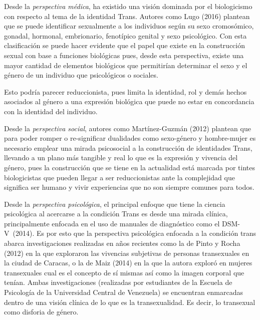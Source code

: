 Desde la \emph{perspectiva médica}, ha existido una visión dominada por el
biologicismo con respecto al tema de la identidad Trans.
Autores como Lugo (2016) plantean que se puede identificar sexualmente a los
individuos según su sexo cromosómico, gonadal, hormonal, embrionario, fenotípico
genital y sexo psicológico.
Con esta clasificación se puede hacer evidente que el papel que existe en la
construcción sexual con base a funciones biológicas pues, desde esta
perspectiva, existe una mayor cantidad de elementos biológicos que
permitirían determinar el sexo y el género de un individuo que psicológicos o
sociales.

Esto podría parecer reduccionista, pues limita la identidad, rol y demás hechos
asociados al género a una expresión biológica que puede no estar en concordancia
con la identidad del individuo.

Desde la \emph{perspectiva social}, autores como Martínez-Guzmán (2012) plantean que
para poder romper o re-significar dualidades como sexo-género y hombre-mujer es
necesario emplear una mirada psicosocial a la construcción de identidades Trans,
llevando a un plano más tangible y real lo que es la expresión y vivencia del
género, pues la construcción que se tiene en la actualidad está marcada por
tintes biologicistas que pueden llegar a ser reduccionistas ante la complejidad
que significa ser humano y vivir experiencias que no son siempre comunes para
todos.

Desde la \emph{perspectiva psicológica}, el principal enfoque que tiene la
ciencia psicológica al acercarse a la condición Trans es desde una mirada
clínica, principalmente enfocada en el uso de manuales de diagnóstico como el
DSM-V~(2014).
Es por esto que la perspectiva psicológica enfocada a la condición trans abarca
investigaciones realizadas en años recientes como la de Pinto y Rocha (2012) en
la que exploraron las vivencias subjetivas de personas transexuales en la ciudad
de Caracas, o la de Maiz (2014) en la que la autora exploró en mujeres
transexuales cual es el concepto de sí mismas así como la imagen corporal que
tenían.
Ambas investigaciones (realizadas por estudiantes de la Escuela de Psicología de
la Universidad Central de Venezuela) se encuentran enmarcadas dentro de una
visión clínica de lo que es la transexualidad.
Es decir, lo transexual como disforia de género.


